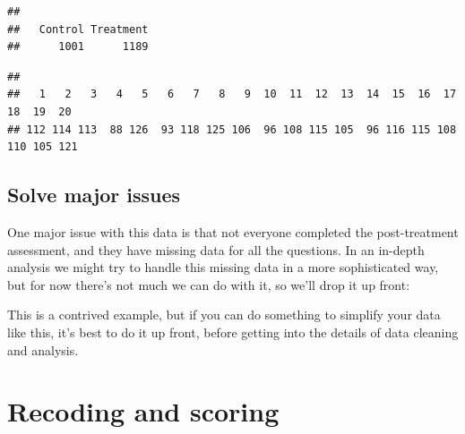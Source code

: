 \documentclass[
]{book}
\newenvironment{Shaded}{\begin{snugshade}}{\end{snugshade}}
\newcommand{\CommentTok}[1]{\textcolor[rgb]{0.56,0.35,0.01}{\textit{#1}}}
\newcommand{\DecValTok}[1]{\textcolor[rgb]{0.00,0.00,0.81}{#1}}
\newcommand{\FunctionTok}[1]{\textcolor[rgb]{0.00,0.00,0.00}{#1}}
\newcommand{\NormalTok}[1]{#1}
\newcommand{\OtherTok}[1]{\textcolor[rgb]{0.56,0.35,0.01}{#1}}
\newcommand{\SpecialCharTok}[1]{\textcolor[rgb]{0.00,0.00,0.00}{#1}}
\begin{document}
\begin{Shaded}
\end{Shaded}

\begin{verbatim}
## 
##   Control Treatment 
##      1001      1189
\end{verbatim}

\begin{Shaded}
\end{Shaded}

\begin{verbatim}
## 
##   1   2   3   4   5   6   7   8   9  10  11  12  13  14  15  16  17  18  19  20 
## 112 114 113  88 126  93 118 125 106  96 108 115 105  96 116 115 108 110 105 121
\end{verbatim}

\hypertarget{solve-major-issues}{%
\subsection{Solve major issues}\label{solve-major-issues}}

One major issue with this data is that not everyone completed the
post-treatment assessment, and they have missing data for all
the questions. In an in-depth analysis we might try to handle
this missing data in a more sophisticated way, but for now there's
not much we can do with it, so we'll drop it up front:

\begin{Shaded}
\end{Shaded}

This is a contrived example, but if you can do something
to simplify your data like this, it's best to do it up front,
before getting into the details of data cleaning and analysis.

\hypertarget{recoding-and-scoring}{%
\section{Recoding and scoring}\label{recoding-and-scoring}}
\end{document}
